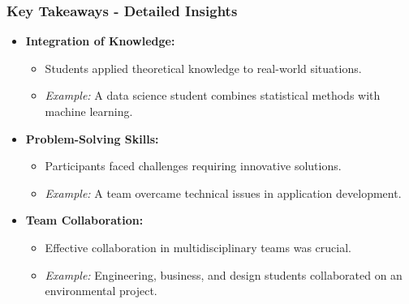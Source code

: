 \documentclass[aspectratio=169]{beamer}
\begin{document}
\begin{frame}[fragile]
  \frametitle{Key Takeaways - Detailed Insights}
  \begin{itemize}
    \item \textbf{Integration of Knowledge:} 
    \begin{itemize}
      \item Students applied theoretical knowledge to real-world situations.
      \item \textit{Example:} A data science student combines statistical methods with machine learning.
    \end{itemize}

    \item \textbf{Problem-Solving Skills:} 
    \begin{itemize}
      \item Participants faced challenges requiring innovative solutions.
      \item \textit{Example:} A team overcame technical issues in application development.
    \end{itemize}

    \item \textbf{Team Collaboration:} 
    \begin{itemize}
      \item Effective collaboration in multidisciplinary teams was crucial.
      \item \textit{Example:} Engineering, business, and design students collaborated on an environmental project.
    \end{itemize}
  \end{itemize}
\end{frame}
\end{document}
